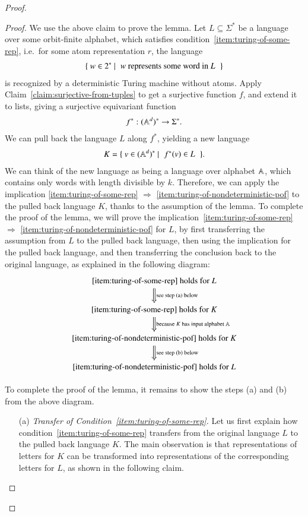 \begin{proof}
\begin{proof}
		We use the above claim to prove the lemma. 
		Let  $L \subseteq \Sigma^*$ be a language over some orbit-finite alphabet, which satisfies condition~\ref{item:turing-of-some-rep}, i.e.~for some atom representation $r$, the language 
		\begin{align*}
		\setbuild{ w \in 2^*}{ $w$ represents some word in $L$}
		\end{align*}
		is recognized by a deterministic Turing machine without atoms.
		Apply Claim~\ref{claim:surjective-from-tuples} to get a surjective function $f$, and  extend it to lists, giving a  surjective equivariant function  
		\begin{align*}
		f^* : (\mathbb A^d)^* \to \Sigma^*.
		\end{align*}
		We can pull back the language $L$ along $f^*$, yielding a new language 
		\begin{align*}
			K = \setbuild{ v \in (\atoms^d)^* }{$f^*(v) \in L$}.
			\end{align*}
		We can think of the new language as being a language over alphabet $\mathbb A$, which contains only words with length divisible by $k$.  Therefore, we can apply the implication \ref{item:turing-of-some-rep} $\Rightarrow$ \ref{item:turing-of-nondeterministic-pof} to the pulled back language $K$, thanks to the assumption of the lemma. To complete the proof of the lemma, we will prove the implication~\ref{item:turing-of-some-rep} $\Rightarrow$ \ref{item:turing-of-nondeterministic-pof} for  $L$, by first transferring the assumption from $L$ to the pulled back language, then using the implication for the pulled back language, and then transferring the conclusion back to the original language, as explained in the following diagram:
		\[
		\begin{tikzcd}
		\text{\ref{item:turing-of-some-rep}  holds for $L$} 
		\ar[d,Rightarrow,"\text{see step (a) below}"] \\
		\text{\ref{item:turing-of-some-rep}  holds for $K$}
		\ar[d,Rightarrow,"\text{because $K$ has input alphabet $\atoms$}"] \\
		\text{\ref{item:turing-of-nondeterministic-pof} holds for $K$}
		\ar[d,Rightarrow,"\text{see step (b) below}"] \\
		\text{\ref{item:turing-of-nondeterministic-pof} holds for $L$}
		\end{tikzcd}
		\]

		To complete the proof of the lemma, it remains to show the steps (a) and (b) from the above diagram.
		\begin{itemize}
			\item[(a)] \emph{Transfer of Condition~\ref{item:turing-of-some-rep}.} 		Let us first explain how condition~\ref{item:turing-of-some-rep} transfers from the original language $L$ to the pulled back language $K$.   The main observation is that representations of letters for $K$ can be transformed into representations of the corresponding letters for $L$, as shown in the following claim.
		

\end{itemize}
\end{proof}
\end{proof}
